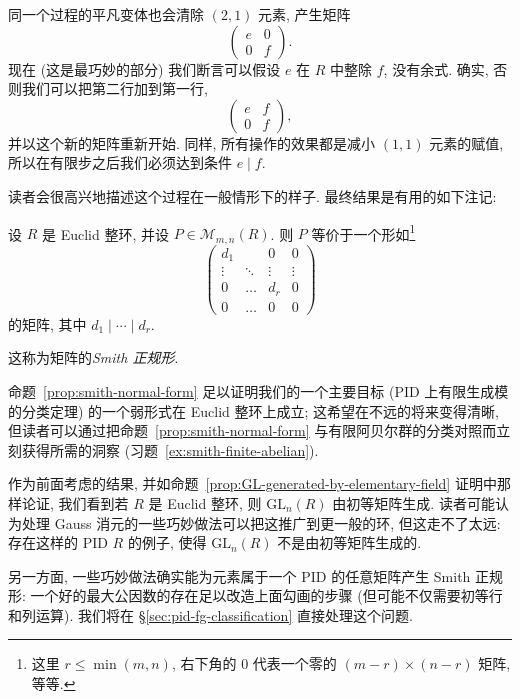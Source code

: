 同一个过程的平凡变体也会清除 $(2,1)$ 元素, 产生矩阵
\[
\begin{pmatrix} e & 0\\ 0 & f\end{pmatrix}.
\]
现在 (这是最巧妙的部分) 我们断言可以假设 $e$ 在 $R$ 中整除 $f$, 没有余式. 确实, 否则我们可以把第二行加到第一行,
\[
\begin{pmatrix} e & f\\ 0 & f\end{pmatrix},
\]
并以这个新的矩阵重新开始. 同样, 所有操作的效果都是减小 $(1,1)$ 元素的赋值, 所以在有限步之后我们必须达到条件 $e\mid f$.

读者会很高兴地描述这个过程在一般情形下的样子. 最终结果是有用的如下注记:

\begin{proposition}\label{prop:smith-normal-form}
设 $R$ 是 Euclid 整环, 并设 $P\in\mathcal{M}_{m,n}(R)$. 则 $P$ 等价于一个形如\footnote{这里 $r\le\min(m,n)$, 右下角的 $0$ 代表一个零的 $(m-r)\times(n-r)$ 矩阵, 等等.}
\[
\begin{pmatrix}
d_1 & & 0 & 0\\
\vdots & \ddots & \vdots & \vdots\\
0 & \dots & d_r & 0\\
\hline
0 & \dots & 0 & 0
\end{pmatrix}
\]
的矩阵, 其中 $d_1\mid\cdots\mid d_r$.
\end{proposition}

这称为矩阵的\emph{Smith 正规形}.

命题~\ref{prop:smith-normal-form} 足以证明我们的一个主要目标 (PID 上有限生成模的分类定理) 的一个弱形式在 Euclid 整环上成立; 这希望在不远的将来变得清晰, 但读者可以通过把命题~\ref{prop:smith-normal-form} 与有限阿贝尔群的分类对照而立刻获得所需的洞察 (习题~\ref{ex:smith-finite-abelian}).

\begin{remark}\label{rmk:GL-euclidean-elementary}
作为前面考虑的结果, 并如命题~\ref{prop:GL-generated-by-elementary-field} 证明中那样论证, 我们看到若 $R$ 是 Euclid 整环, 则 $\mathrm{GL}_n(R)$ 由初等矩阵生成. 读者可能认为处理 Gauss 消元的一些巧妙做法可以把这推广到更一般的环, 但这走不了太远: 存在这样的 PID $R$ 的例子, 使得 $\mathrm{GL}_n(R)$ 不是由初等矩阵生成的.

另一方面, 一些巧妙做法确实能为元素属于一个 PID 的任意矩阵产生 Smith 正规形: 一个好的最大公因数的存在足以改造上面勾画的步骤 (但可能不仅需要初等行和列运算). 我们将在 §\ref{sec:pid-fg-classification} 直接处理这个问题.
\end{remark}

